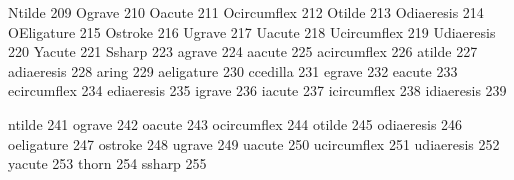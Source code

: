  Ntilde          209
 Ograve          210
 Oacute          211
 Ocircumflex     212
 Otilde          213
 Odiaeresis      214
 OEligature      215
 Ostroke         216
 Ugrave          217
 Uacute          218
 Ucircumflex     219
 Udiaeresis      220
 Yacute          221
 Ssharp          223  
 agrave          224
 aacute          225
 acircumflex     226
 atilde          227
 adiaeresis      228
 aring           229
 aeligature      230
 ccedilla        231
 egrave          232
 eacute          233
 ecircumflex     234
 ediaeresis      235
 igrave          236
 iacute          237
 icircumflex     238
 idiaeresis      239

 ntilde          241
 ograve          242
 oacute          243
 ocircumflex     244
 otilde          245
 odiaeresis      246
 oeligature      247
 ostroke         248
 ugrave          249
 uacute          250
 ucircumflex     251
 udiaeresis      252
 yacute          253
 thorn           254 
 ssharp          255  

\stopencoding

\endinput
